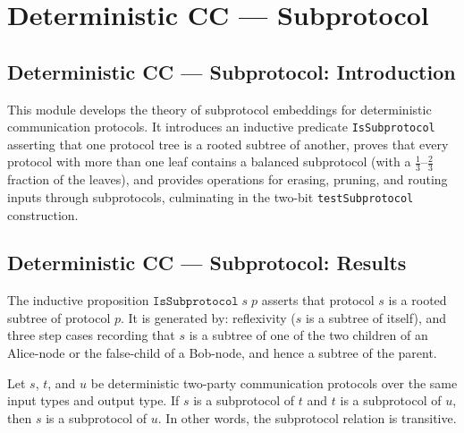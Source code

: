 \section{Deterministic CC --- Subprotocol}
\subsection*{Deterministic CC --- Subprotocol: Introduction}

This module develops the theory of subprotocol embeddings for deterministic communication
protocols.  It introduces an inductive predicate \texttt{IsSubprotocol} asserting that one
protocol tree is a rooted subtree of another, proves that every protocol with more than one
leaf contains a balanced subprotocol (with a $\frac{1}{3}$--$\frac{2}{3}$ fraction of the
leaves), and provides operations for erasing, pruning, and routing inputs through
subprotocols, culminating in the two-bit \texttt{testSubprotocol} construction.

\subsection*{Deterministic CC --- Subprotocol: Results}

\begin{definition}
\label{CommunicationComplexity.Deterministic.Protocol.IsSubprotocol}
\leanok
{}
The inductive proposition $\texttt{IsSubprotocol}\; s\; p$ asserts that protocol $s$ is a
rooted subtree of protocol $p$.  It is generated by: reflexivity ($s$ is a subtree of
itself), and three step cases recording that $s$ is a subtree of one of the two children of
an Alice-node or the false-child of a Bob-node, and hence a subtree of the parent.
\end{definition}

\begin{lemma}
\label{CommunicationComplexity.Deterministic.Protocol.IsSubprotocol.trans}
\leanok
{}
Let $s$, $t$, and $u$ be deterministic two-party communication protocols over the same
input types and output type. If $s$ is a subprotocol of $t$ and $t$ is a subprotocol of
$u$, then $s$ is a subprotocol of $u$. In other words, the subprotocol relation is
transitive.
\end{lemma}

